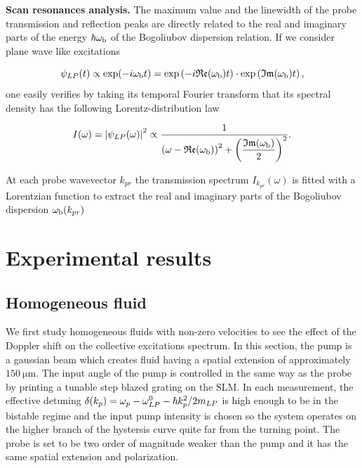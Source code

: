 \textbf{Scan resonances analysis.} The maximum value and the linewidth of the probe transmission and reflection peaks are directly related to the real and imaginary parts of the energy $\hbar \omega_{\mathrm{b}}$ of the Bogoliubov dispersion relation.
  If we consider plane wave like excitations

\begin{equation}
    \psi_{LP}(t) \propto \mathrm{exp} (-i \omega_{\mathrm{b}} t) = \mathrm{exp} \left (- i \mathfrak{Re} (\omega_{\mathrm{b}}) t \right ) \cdot \mathrm{exp} \left( \mathfrak{Im} (\omega_{\mathrm{b}}) t \right),
\end{equation}
one easily verifies by taking its temporal Fourier transform that its spectral density has the following Lorentz-distribution law

\begin{equation}
    I(\omega) = \abs{\psi_{LP}(\omega)}^2 \propto \dfrac{1}{ \left(\omega - \mathfrak{Re}(\omega_{\mathrm{b}}) \right)^2 + \left( \dfrac{\mathfrak{Im}(\omega_{\mathrm{b}})}{2} \right)^2}.
\end{equation}

At each probe wavevector $k_{pr}$ the transmission spectrum $I_{k_{pr}}(\omega)$ is fitted with a Lorentzian function to extract the real and imaginary parts of the Bogoliubov dispersion $\omega_{\mathrm{b}}(k_{pr})$
\section{Experimental results}

\subsection{Homogeneous fluid}

We first study homogeneous fluids with non-zero velocities to see the effect of the Doppler shift on the collective excitations spectrum. In this section,
the pump is a gaussian beam which creates fluid having a spatial extension of approximately $150 \ \mathrm{\mu m}$. The input angle of the pump
is controlled in the same way as the probe by printing a tunable step blazed grating on the SLM. In each measurement, the effective detuning 
$\delta(k_p)=\omega_p -\omega_{LP}^0- \hbar k_p^2/2m_{LP}$ is high enough to be in the bistable regime and the input pump intensity is chosen so the system operates on the higher branch of the hystersis curve quite far from the turning point. 
The probe is set to be two order of magnitude weaker than the pump and it has the same spatial extension and polarization.

\bigskip

